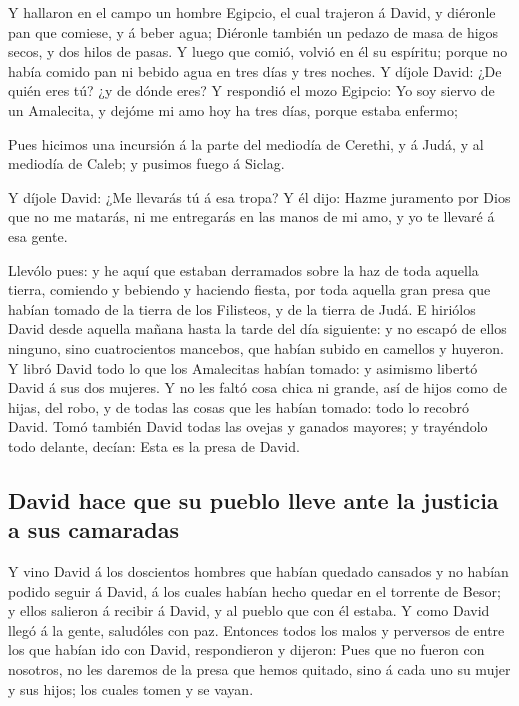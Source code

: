  Y hallaron en el campo un hombre Egipcio, el cual
trajeron á David, y diéronle pan que comiese, y á beber agua;
 Diéronle también un pedazo de masa de higos secos, y dos
hilos de pasas. Y luego que comió, volvió en él su espíritu; porque no
había comido pan ni bebido agua en tres días y tres noches.
 Y díjole David: ¿De quién eres tú? ¿y de dónde eres? Y
respondió el mozo Egipcio: Yo soy siervo de un Amalecita, y dejóme mi
amo hoy ha tres días, porque estaba enfermo;

 Pues hicimos una incursión á la parte del mediodía de
Cerethi, y á Judá, y al mediodía de Caleb; y pusimos fuego á Siclag.

 Y díjole David: ¿Me llevarás tú á esa tropa? Y él dijo:
Hazme juramento por Dios que no me matarás, ni me entregarás en las
manos de mi amo, y yo te llevaré á esa gente.

 Llevólo pues: y he aquí que estaban derramados sobre la
haz de toda aquella tierra, comiendo y bebiendo y haciendo fiesta, por
toda aquella gran presa que habían tomado de la tierra de los Filisteos,
y de la tierra de Judá.  E hiriólos David desde aquella
mañana hasta la tarde del día siguiente: y no escapó de ellos ninguno,
sino cuatrocientos mancebos, que habían subido en camellos y huyeron.
 Y libró David todo lo que los Amalecitas habían tomado:
y asimismo libertó David á sus dos mujeres.  Y no les
faltó cosa chica ni grande, así de hijos como de hijas, del robo, y de
todas las cosas que les habían tomado: todo lo recobró David.
 Tomó también David todas las ovejas y ganados mayores; y
trayéndolo todo delante, decían: Esta es la presa de David.

\hypertarget{david-hace-que-su-pueblo-lleve-ante-la-justicia-a-sus-camaradas}{%
\subsection{David hace que su pueblo lleve ante la justicia a sus
camaradas}\label{david-hace-que-su-pueblo-lleve-ante-la-justicia-a-sus-camaradas}}

 Y vino David á los doscientos hombres que habían quedado
cansados y no habían podido seguir á David, á los cuales habían hecho
quedar en el torrente de Besor; y ellos salieron á recibir á David, y al
pueblo que con él estaba. Y como David llegó á la gente, saludóles con
paz.  Entonces todos los malos y perversos de entre los
que habían ido con David, respondieron y dijeron: Pues que no fueron con
nosotros, no les daremos de la presa que hemos quitado, sino á cada uno
su mujer y sus hijos; los cuales tomen y se vayan.

